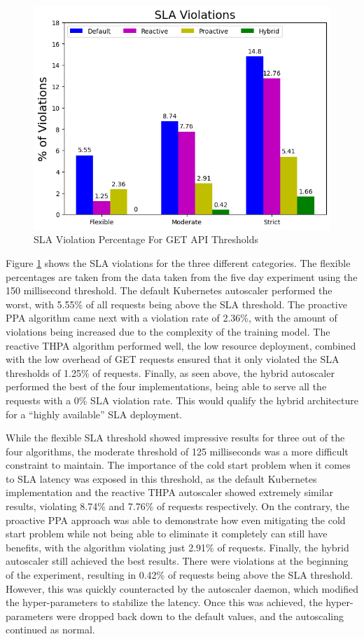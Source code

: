 \begin{figure}[htb]
    \centering
    \caption{SLA Violation Percentage For GET API Thresholds}
    \label{fig:exp1-sla-violation-bar}
    \includegraphics[width=0.6\linewidth]{Figures/Home-Timeline-SLA-Violations.png}
\end{figure}

Figure \ref{fig:exp1-sla-violation-bar} shows the SLA violations for the three different categories. The flexible percentages are taken from the data taken from the five day experiment using the 150 millisecond threshold. The default Kubernetes autoscaler performed the worst, with 5.55\% of all requests being above the SLA threshold. The proactive PPA algorithm came next with a violation rate of 2.36\%, with the amount of violations being increased due to the complexity of the training model. The reactive THPA algorithm performed well, the low resource deployment, combined with the low overhead of GET requests ensured that it only violated the SLA thresholds of 1.25\% of requests. Finally, as seen above, the hybrid autoscaler performed the best of the four implementations, being able to serve all the requests with a 0\% SLA violation rate. This would qualify the hybrid architecture for a ``highly available'' SLA deployment.\par

While the flexible SLA threshold showed impressive results for three out of the four algorithms, the moderate threshold of 125 milliseconds was a more difficult constraint to maintain. The importance of the cold start problem when it comes to SLA latency was exposed in this threshold, as the default Kubernetes implementation and the reactive THPA autoscaler showed extremely similar results, violating 8.74\% and 7.76\% of requests respectively. On the contrary, the proactive PPA approach was able to demonstrate how even mitigating the cold start problem while not being able to eliminate it completely can still have benefits, with the algorithm violating just 2.91\% of requests. Finally, the hybrid autoscaler still achieved the best results. There were violations at the beginning of the experiment, resulting in 0.42\% of requests being above the SLA threshold. However, this was quickly counteracted by the autoscaler daemon, which modified the hyper-parameters to stabilize the latency. Once this was achieved, the hyper-parameters were dropped back down to the default values, and the autoscaling continued as normal.\par

